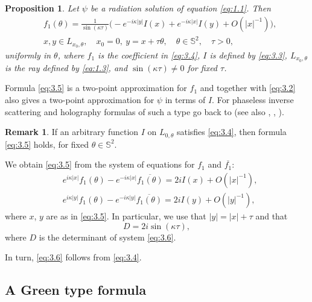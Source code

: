 \documentclass[JEP,XML,SOM,Unicode,NoEqCountersInSection,published]{cedram}
\newtheorem{proposition}{Proposition}
\theoremstyle{definition}
\newtheorem{remark}{Remark}
\begin{document}
\begin{proposition}\label{prop:1}
Let $\psi$ be a radiation solution of equation \eqref{eq:1.1}. Then
\begin{equation}\label{eq:3.5}
\begin{aligned}
&f_1(\theta)= \frac{1}{\sin(\kappa\tau)}\bigl(-e^{-i\kappa|y|}I(x)+e^{-i\kappa|x|}I(y)+O(|x|^{-1})\bigr),\\
&x,y\in L_{x_0, \theta},\quad x_0=0,\ y=x+\tau\theta, \quad\theta\in\mathbb S^2,\quad \tau>0,
\end{aligned}
\end{equation}
uniformly in $\theta$, where $f_1$ is the coefficient in \eqref{eq:3.4}, $I$ is defined by \eqref{eq:3.3}, $L_{x_0, \theta}$ is the ray defined by \eqref{eq:1.3},
and $\sin(\kappa\tau)\ne 0$ for fixed $\tau$.
\end{proposition}

Formula \eqref{eq:3.5} is a two-point approximation for $f_1$ and together with \eqref{eq:3.2} also gives a two-point approximation for $\psi$
in terms of $I$.
For phaseless inverse scattering and holography formulas of such a type go back to \cite{N1} (see also \cite{NS2}, \cite{NSh}, \cite{N5}).

\begin{remark}\label{rem:4}
If an arbitrary function $I$ on $L_{0, \theta}$ satisfies \eqref{eq:3.4},
then formula \eqref{eq:3.5} holds, for fixed $\theta\in\mathbb S^2$.
\end{remark}

We obtain \eqref{eq:3.5} from the system of equations for $f_1$ and $\overline {f_1}$:
\begin{equation}\label{eq:3.6}
\begin{aligned}
&e^{i\kappa|x|}f_1(\theta)-e^{-i\kappa|x|} \overline {f_1(\theta)}=2iI(x)+O(|x|^{-1}),\\
&e^{i\kappa|y|}f_1(\theta)-e^{-i\kappa|y|} \overline {f_1(\theta)}=2iI(y)+O(|y|^{-1}),
\end{aligned}
\end{equation}
where $x$, $y$ are as in \eqref{eq:3.5}. In particular, we use that $|y|=|x|+\tau$ and that
\begin{equation}
\label{eq:3.7}
D=2i \sin(\kappa\tau),
\end{equation}
where $D$ is the determinant of system \eqref{eq:3.6}.

In turn, \eqref{eq:3.6} follows from \eqref{eq:3.4}.

\subsection{A Green type formula}\label{subsec:3.3}
\end{document}
